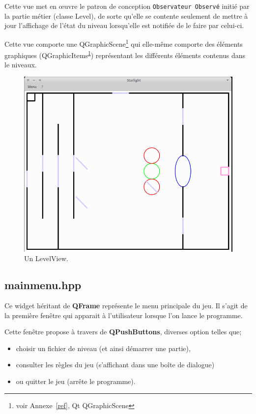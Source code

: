 \documentclass[a4paper,11pt]{report}
\begin{document}
Cette vue met en œuvre le patron de conception \texttt{Observateur Observé} initié par
la partie métier (classe Level), de sorte qu'elle se contente seulement de
mettre à jour l'affichage de l'état du niveau lorsqu'elle est notifiée de le
faire par celui-ci. 

Cette vue comporte une QGraphicScene\footnote{\label{qgs}voir Annexe~\ref{ref},
Qt QGraphicScene} qui elle-même comporte des éléments graphiques 
(QGraphicItems\textsuperscript{\ref{qgs}}) représentant les différents éléments contenus
dans le niveaux. 

\begin{figure}[h!]
	\caption{Un LevelView.}
	\centering
	\includegraphics[keepaspectratio=true,width=0.7\linewidth]{./screenshots/level_view}
\end{figure}

\subsection[Le menu]{mainmenu.hpp}
Ce widget héritant de \textbf{QFrame} représente le menu principale du jeu. Il s'agit de
la première fenêtre qui apparait à l'utilisateur lorsque l'on lance le
programme. 

Cette fenêtre propose à travers de \textbf{QPushButtons}, diverses option
telles que; 
\begin{itemize}
	\item choisir un fichier de niveau (et ainsi démarrer une partie),
	\item consulter les règles du jeu (s'affichant dans une boîte de dialogue) 
	\item ou quitter le jeu (arrête le programme).
\end{itemize}
\end{document}
